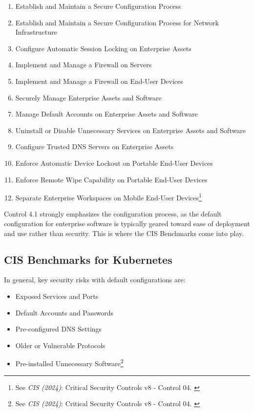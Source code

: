 \begin{enumerate}
    \item Establish and Maintain a Secure Configuration Process
    \item Establish and Maintain a Secure Configuration Process for
Network Infrastructure
    \item Configure Automatic Session Locking on Enterprise Assets
    \item Implement and Manage a Firewall on Servers
    \item Implement and Manage a Firewall on End-User Devices
    \item Securely Manage Enterprise Assets and Software
    \item Manage Default Accounts on Enterprise Assets and Software
    \item Uninstall or Disable Unnecessary Services on Enterprise Assets
and Software
    \item Configure Trusted DNS Servers on Enterprise Assets
    \item Enforce Automatic Device Lockout on Portable End-User Devices
    \item Enforce Remote Wipe Capability on Portable End-User Devices
    \item Separate Enterprise Workspaces on Mobile End-User Devices\footnote{See \textit{CIS (2024)}: Critical Security Controls v8 - Control 04. \cite{cisControls}}
\end{enumerate}

Control 4.1 strongly emphasizes the configuration process, as the default configuration for enterprise software is typically geared toward ease of deployment and use rather than security. This is where the CIS Benchmarks come into play.

\subsection{CIS Benchmarks for Kubernetes}

In general, key security risks with default configurations are:

\begin{itemize}
    \item Exposed Services and Ports
    \item Default Accounts and Passwords
    \item Pre-configured DNS Settings
    \item Older or Vulnerable Protocols
    \item Pre-installed Unnecessary Software\footnote{See \textit{CIS (2024)}: Critical Security Controls v8 - Control 04. \cite{cisControls}}
\end{itemize}


